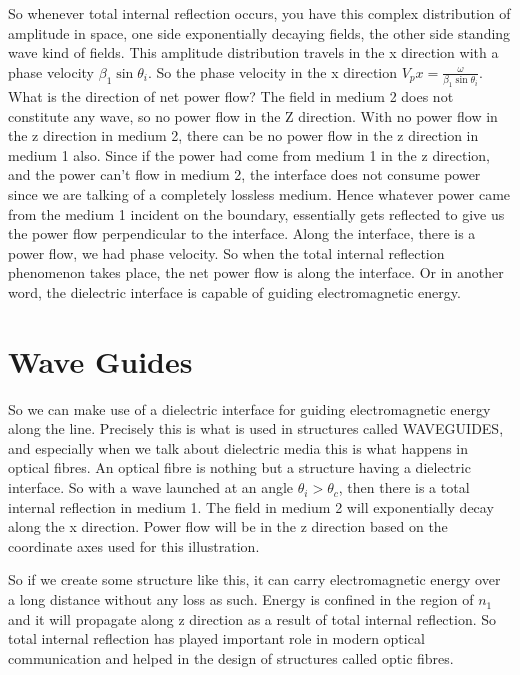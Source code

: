 So whenever total internal reflection occurs, you have this complex distribution of amplitude in space, one side exponentially decaying fields, the other side standing wave kind of fields. This amplitude distribution travels in the x direction with a phase velocity $\beta_1\sin\theta_i$. So the phase velocity in the x direction $V_px = \frac{\omega}{\beta_1\sin\theta_i}$. What is the direction of net power flow? The field in medium 2 does not constitute any wave, so no power flow in the Z direction. With no power flow in the z direction in medium 2, there can be no power flow in the z direction in medium 1 also. Since if the power had come from medium 1 in the z direction, and the power can't flow in medium 2, the interface does not consume power since we are talking of a completely lossless medium. Hence whatever power came from the medium 1 incident on the boundary, essentially gets reflected to give us the power flow perpendicular to the interface. Along the interface, there is a power flow, we had phase velocity. So when the total internal reflection phenomenon takes place, the net power flow is along the interface. Or in another word, the dielectric interface is capable of guiding electromagnetic energy.

\section{Wave Guides}

So we can make use of a dielectric interface for guiding electromagnetic energy along the line. Precisely this is what is used in structures called WAVEGUIDES, and especially when we talk about dielectric media this is what happens in optical fibres. An optical fibre is nothing but a structure having a dielectric interface. So with a wave launched at an angle $\theta_i > \theta_c$,
then there is a total internal reflection in medium 1. The field in medium 2 will exponentially decay along the x direction. Power flow will be in the z direction based on the coordinate axes used for this illustration.

So if we create some structure like this, it can carry electromagnetic energy over a long distance without any loss as such. Energy is confined in the region of $n_1$ and it will propagate along z direction as a result of total internal reflection. So total internal reflection has played important role in modern optical communication and helped in the design of structures called optic fibres. 
